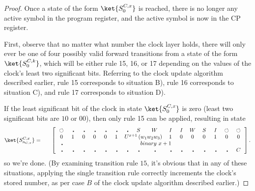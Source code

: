 \documentclass[11pt,letterpaper]{article}
\newcommand{\<}{\langle}
\renewcommand{\>}{\rangle}
\newcommand{\tur}{\,\circlearrowleft\,}   %
\newcommand{\bul}{\:\:\centerdot\:}       %
\newcommand{\iga}{\:I\,}                  %
\newcommand{\wga}{W}						%
\newcommand{\sga}{\:S\,}					%
\begin{document}
\begin{proof}
Once a state of the form $\ket{S^{C,x}_0}$ is reached, there is no longer any active symbol in the program register, and the active symbol is now in the CP register.

First, observe that no matter what number the clock layer holds, there will only ever be one of four possibly valid forward transitions from a state of the form $\ket{S^{C,k}_0}$, which will be either rule 15, 16, or 17 depending on the values of the clock's least two significant bits. Referring to the clock update algorithm described earlier, rule 15 corresponds to situation B), rule 16 corresponds to situation C), and rule 17 corresponds to situation D).

If the least significant bit of the clock in state $\ket{S^{C,x}_0}$ is zero (least two significant bits are $10$ or $00$), then only rule 15 can be applied, resulting in state 
	\begin{eqnarray}
			\ket{S^{C,x}_{n_{C,x}}} &=& \quad \left[ \begin{array}{cccccccccccccccc}
				\tur & \bul & 
				\bul & \bul & \bul & \bul & \bul & \sga & \wga & \iga & \iga & 
			\wga & \sga & \iga & \tur & \tur
				\\		
				0    & 1    & 0    & 0    & 0    & 1    & 
				\multicolumn{3}{c}{U^{x+1}\left(w_1w_2w_3\right)}  &
				1    & 0    & 0    & 0    & 1    & 0 & 0
				\\
				\bul & \multicolumn{15}{c}{binary~x+1}
				\\
				\bul & \bul & \bul & \bul & \bul & \bul & \bul & \bul & \bul & \bul & \bul & \bul & \bul & \bul & \bul & C
		 	\end{array} \right]. \label{endstate}
		\end{eqnarray}
so we're done. (By examining transition rule $15$, it's obvious that in any of these situations, applying the single transition rule correctly increments the clock's stored number, as per case $B$ of the clock update algorithm described earlier.)


\end{proof}
\end{document}
